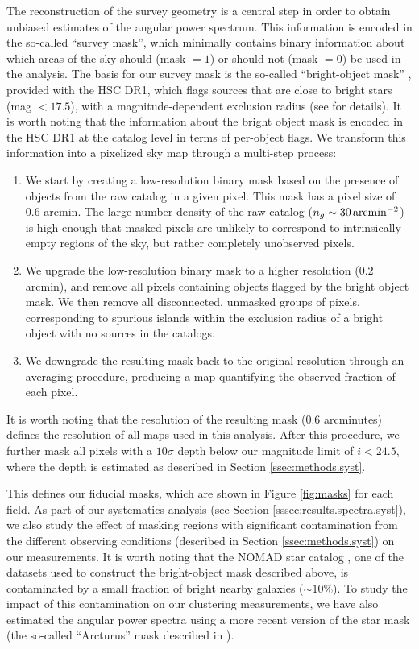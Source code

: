 \documentclass[a4paper,11pt]{article}
\begin{document}
    The reconstruction of the survey geometry is a central step in order to obtain unbiased estimates of the angular power spectrum. This information is encoded in the so-called ``survey mask'', which minimally contains binary information about which areas of the sky should (mask $=1$) or should not (mask $=0$) be used in the analysis. The basis for our survey mask is the so-called ``bright-object mask'' \cite{2018PASJ...70S...7C}, provided with the HSC DR1, which flags sources that are close to bright stars (mag $<17.5$), with a magnitude-dependent exclusion radius (see \cite{2018PASJ...70S...7C} for details). It is worth noting that the information about the bright object mask is encoded in the HSC DR1 at the catalog level in terms of per-object flags. We transform this information into a pixelized sky map through a multi-step process:
    \begin{enumerate}
      \item We start by creating a low-resolution binary mask based on the presence of objects from the raw catalog in a given pixel. This mask has a pixel size of 0.6 arcmin. The large number density of the raw catalog  ($n_g\sim30\,{\rm arcmin}^{-2}$) is high enough that masked pixels are unlikely to correspond to intrinsically empty regions of the sky, but rather completely unobserved pixels.
      \item We upgrade the low-resolution binary mask to a higher resolution (0.2 arcmin), and remove all pixels containing objects flagged by the bright object mask. We then remove all disconnected, unmasked groups of pixels, corresponding to spurious islands within the exclusion radius of a bright object with no sources in the catalogs.
      \item We downgrade the resulting mask back to the original resolution through an averaging procedure, producing a map quantifying the observed fraction of each pixel.
    \end{enumerate}
    It is worth noting that the resolution of the resulting mask ($0.6$ arcminutes) defines the resolution of all maps used in this analysis. After this procedure, we further mask all pixels with a $10\sigma$ depth below our magnitude limit of $i<24.5$, where the depth is estimated as described in Section \ref{ssec:methods.syst}.

    This defines our fiducial masks, which are shown in Figure \ref{fig:masks} for each field. As part of our systematics analysis (see Section \ref{sssec:results.spectra.syst}), we also study the effect of masking regions with significant contamination from the different observing conditions (described in Section \ref{ssec:methods.syst}) on our measurements. It is worth noting that the NOMAD star catalog \cite{2004AAS...205.4815Z}, one of the datasets used to construct the bright-object mask described above, is contaminated by a small fraction of bright nearby galaxies ($\sim10\%$). To study the impact of this contamination on our clustering measurements, we have also estimated the angular power spectra using a more recent version of the star mask (the so-called ``Arcturus'' mask described in \cite{2018PASJ...70S...7C}).
\end{document}
